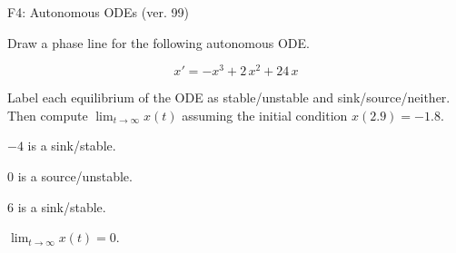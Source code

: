 \begin{exercise}
  \begin{exerciseTitle}F4: Autonomous ODEs (ver. 99)\end{exerciseTitle}
  \begin{exerciseStatement}
    

      Draw a phase line for the following 
      autonomous ODE.
    

    
\[x'= -x^{3} + 2 \, x^{2} + 24 \, x\]

    

      Label each equilibrium of the ODE
      as stable/unstable and sink/source/neither.
      Then compute \(\lim_{t\to\infty}x(t)\)
      assuming the initial condition
      \(x( 2.9 )= -1.8\).
    

  \end{exerciseStatement}
  \begin{exerciseAnswer}
    

      \(-4\) is a sink/stable.
      
        \(0\) is a source/unstable.
      
      \(6\) is a sink/stable.
    

    

      \(\lim_{t\to\infty}x(t)=0\).
    

  \end{exerciseAnswer}
\end{exercise}